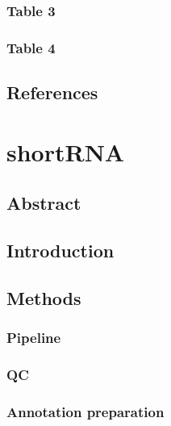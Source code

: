 \documentclass[12pt,twoside]{reedthesis}
\begin{document}
\newpage

\hypertarget{table-3}{%
\subsection{Table 3}\label{table-3}}

\newpage

\hypertarget{table-4}{%
\subsection{Table 4}\label{table-4}}

\newpage

\hypertarget{references-1}{%
\section{References}\label{references-1}}

\hypertarget{shortRNA}{%
\chapter{shortRNA}\label{shortRNA}}

\hypertarget{abstract-3}{%
\section{Abstract}\label{abstract-3}}

\hypertarget{introduction-2}{%
\section{Introduction}\label{introduction-2}}

\hypertarget{methods-2}{%
\section{Methods}\label{methods-2}}

\hypertarget{pipeline}{%
\subsection{Pipeline}\label{pipeline}}

\hypertarget{qc}{%
\subsection{QC}\label{qc}}

\hypertarget{annotation-preparation}{%
\subsection{Annotation preparation}\label{annotation-preparation}}
\end{document}
